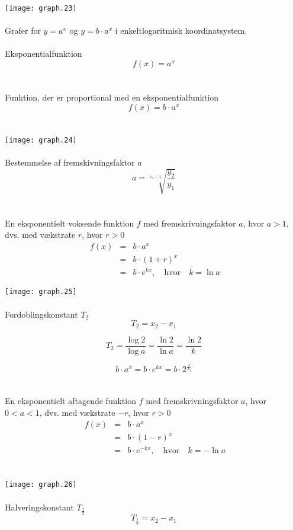 \documentclass[11pt,a5paper,fleqn,leqno]{book}
\begin{document}
\texttt{[image: graph.23]}
\\
\\
Grafer for $y = a^x$ og $y = b \cdot a^x$ i enkeltlogaritmisk koordinatsystem.
\\
\\
Eksponentialfunktion
\begin{equation}
f(x) = a^x
\end{equation}
\\
\\
Funktion, der er proportional med en eksponentialfunktion
\begin{equation}
f(x) = b \cdot a^x
\end{equation}
\\
\\
\texttt{[image: graph.24]}
\\
\\
Bestemmelse af fremskivningsfaktor $a$
\begin{equation}
a = \sqrt[x_2-x_1]{\frac{y_2}{y_1}}
\end{equation}
\\
\\
En eksponentielt voksende funktion $f$ med fremskrivningsfaktor $a$, hvor $a > 1$, dvs. med vækstrate $r$, hvor $r > 0$
\begin{eqnarray}
\; f(x) & = & b \cdot a^x \\
 & = & b \cdot (1+r)^x \nonumber \\
 & = & b \cdot e^{kx}, \quad \text{hvor} \quad k = \ln a \nonumber
\end{eqnarray}

\newpage

\texttt{[image: graph.25]}
\\
\\
Fordoblingskonstant $T_2$
\begin{equation}
T_2 = x_2 - x_1
\end{equation}

\begin{equation}
T_2 = \frac{\log 2}{\log a} = \frac{\ln 2}{\ln a} = \frac{\ln 2}{k}
\end{equation}

\begin{equation}
b \cdot a^x = b \cdot e^{kx} = b \cdot 2^{\frac{x}{T_2}}
\end{equation}
\\
\\
En eksponentielt aftagende funktion $f$ med fremskrivningsfaktor $a$, hvor $0 < a < 1$, dvs. med vækstrate $-r$, hvor $r > 0$
\begin{eqnarray}
\; f(x) & = & b \cdot a^x \\
 & = & b \cdot (1-r)^x \nonumber \\
 & = & b \cdot e^{-kx}, \quad \text{hvor} \quad k = -\ln a \nonumber
\end{eqnarray}
\\
\\
\texttt{[image: graph.26]}
\\
\\
Halveringskonstant $T_{\frac{1}{2}}$
\begin{equation}
T_{\frac{1}{2}} = x_2 - x_1
\end{equation}
\end{document}
